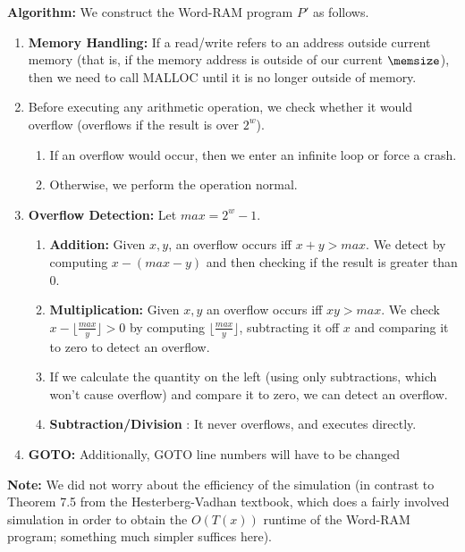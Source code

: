 \documentclass[11pt]{article}
\begin{document}
\begin{enumerate}
\begin{enumerate}
\textbf{Algorithm:}
We construct the Word-RAM program $P'$ as follows.

\begin{enumerate}
    \item \textbf{Memory Handling: } If a read/write refers to an address outside current memory (that is, if the memory address is outside of our current $\memsize$), then we need to call MALLOC until it is no longer outside of memory.
    \item Before executing any arithmetic operation, we check whether it would overflow (overflows if the result is over $2^w$).
        \begin{enumerate}
            \item If an overflow would occur, then we enter an infinite loop or force a crash.
            \item Otherwise, we perform the operation normal.
            \end{enumerate}
    \item \textbf{Overflow Detection: } Let $max=2^w-1$.
            \begin{enumerate}
                \item \textbf{Addition:} Given $x,y$, an overflow occurs iff $x+y > max.$ We detect by computing $x - (max -y)$ and then checking if the result is greater than 0.
                \item \textbf{Multiplication:} Given $x,y$ an overflow occurs iff $xy > max.$ We check $x - \lfloor \frac{max}{y} \rfloor > 0$ by computing $\lfloor \frac{max}{y} \rfloor$, subtracting it off $x$  and comparing it to zero to detect an overflow.
                \item If we calculate the quantity on the left (using only subtractions, which won't cause overflow) and compare it to zero, we can detect an overflow.
                \item \textbf{Subtraction/Division }: It never overflows, and executes directly.
            \end{enumerate}

    \item \textbf{GOTO: } Additionally, GOTO line numbers will have to be changed
\end{enumerate}

      \vspace{0.1in}
      \textbf{Note:} We did not worry about the efficiency of the simulation (in contrast to Theorem 7.5 from the Hesterberg-Vadhan textbook, which does a fairly involved simulation in order to obtain the $O(T(x))$ runtime  of the Word-RAM program; something much simpler suffices here).


\end{enumerate}
\end{enumerate}
\end{document}
